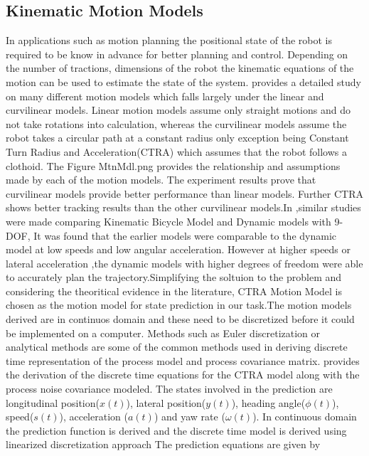 \subsection{Kinematic Motion Models}
In applications such as motion planning the positional state of the robot is required to be know in advance for better planning and control. Depending on the number of tractions, dimensions of the robot the 
kinematic equations of the motion can be used to estimate the state of the system. \cite{R.Schubert} provides a detailed study on many different motion models which falls largely under the linear and curvilinear
models. Linear motion models assume only straight motions and do not take rotations into calculation, whereas the curvilinear models assume the robot takes a circular path at a constant radius only exception being 
Constant Turn  Radius and Acceleration(CTRA) which assumes that the robot follows a clothoid. The Figure \figurename{MtnMdl.png} provides the relationship and assumptions made by each of the motion models.
The experiment results prove that curvilinear models provide better performance than linear models. Further CTRA shows better tracking results than the other curvilinear models.In \cite{Polack},similar studies were made
comparing Kinematic Bicycle Model and Dynamic models with 9-DOF, It was found that the earlier models were comparable to the dynamic model at low speeds and low angular acceleration. However at higher speeds or lateral
acceleration ,the dynamic models with higher degrees of freedom were able to accurately plan the trajectory.Simplifying the soltuion to the problem and considering the theoritical  evidence in the literature, 
CTRA Motion Model is chosen as the motion model for state prediction in our task.The motion models derived are 
in continuos domain and these need to be discretized before it could be implemented on a computer. Methods such as Euler discretization or analytical methods are some of the common methods used in deriving
discrete time representation of the process model and process covariance matrix.\cite{D.Svensson} provides the
derivation of the discrete time equations for the CTRA model along with the process noise covariance modeled.  The states involved in the prediction are longitudinal position($x(t)$), lateral position($y(t)$), heading angle($\phi(t)$), speed($s(t)$),
acceleration ($a(t)$) and yaw rate ($\omega(t)$). In continuous domain the prediction function is derived and the discrete time model is derived using linearized discretization approach
The prediction equations are given by 
